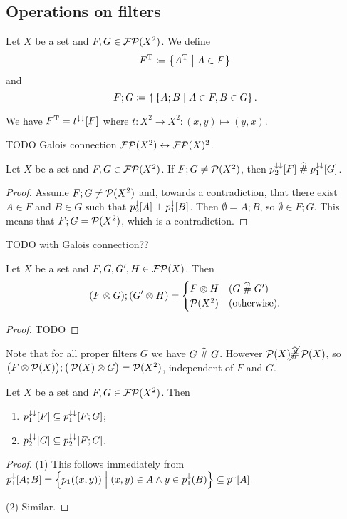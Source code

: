 \subsection{Operations on filters}
\begin{definition}
Let $X$ be a set and $F,G\in\operatorname{\mathcal{FP}}(X^2)$. We define
\[ F^{\mathrm{T}} \coloneqq \left\{ A^{\mathrm{T}} \;\middle|\; A\in F \right\}  \]
and
\[ F;G \coloneqq \operatorname{\uparrow} \left\{ A;B \;\middle|\; A\in F, B\in G \right\}. \]
\end{definition}

We have $F^{\mathrm{T}} = t^{\downarrow\downarrow}[F]$ where $t: X^2 \to X^2: (x,y)\mapsto (y,x)$.

TODO Galois connection $\operatorname{\mathcal{FP}}(X^2) \leftrightarrow \operatorname{\mathcal{FP}}(X)^2$.

\begin{lemma} \label{meshingFilterComposition}
Let $X$ be a set and $F,G\in\operatorname{\mathcal{FP}}(X^2)$. If $F;G \neq \operatorname{\mathcal{P}}(X^2)$, then $p_2^{\downarrow\downarrow}[F]\mathrel{\widehat{\#}} p_1^{\downarrow\downarrow}[G]$.
\end{lemma}
\begin{proof}
Assume $F;G \neq \operatorname{\mathcal{P}}(X^2)$ and, towards a contradiction, that there exist $A\in F$ and $B\in G$ such that $p_2^{\downarrow}[A]\perp p_1^{\downarrow}[B]$. Then $\emptyset = A;B$, so $\emptyset \in F;G$. This means that $F;G = \operatorname{\mathcal{P}}(X^2)$, which is a contradiction.
\end{proof}
TODO with Galois connection??

\begin{lemma} \label{compositionProductFilters}
Let $X$ be a set and $F,G, G', H\in\operatorname{\mathcal{FP}}(X)$. Then
\[ (F\otimes G);(G'\otimes H) = \begin{cases}
F\otimes H & (G\mathrel{\widehat{\#}} G') \\
\operatorname{\mathcal{P}}(X ^2) & (\text{otherwise}).
\end{cases}  \]
\end{lemma}
\begin{proof}
TODO
\end{proof}

Note that for all proper filters $G$ we have $G\mathrel{\widehat{\#}} G$. However $\operatorname{\mathcal{P}}(X)\cancel{\mathrel{\widehat{\#}}}\operatorname{\mathcal{P}}(X)$, so $\big(F\otimes \operatorname{\mathcal{P}}(X)\big);\big(\operatorname{\mathcal{P}}(X)\otimes G\big) = \operatorname{\mathcal{P}}(X^2)$, independent of $F$ and $G$.

\begin{lemma} \label{componentInclusionsFilterComposition}
Let $X$ be a set and $F,G\in\operatorname{\mathcal{FP}}(X^2)$. Then
\begin{enumerate}
\item $p_1^{\downarrow\downarrow}[F]\subseteq p_1^{\downarrow\downarrow}[F;G]$;
\item $p_2^{\downarrow\downarrow}[G]\subseteq p_2^{\downarrow\downarrow}[F;G]$.
\end{enumerate}
\end{lemma}
\begin{proof}
(1) This follows immediately from $p_1^{\downarrow}[A;B] = \left\{ p_1((x,y)) \;\middle|\; (x,y)\in A \land y\in p_1^{\downarrow}(B) \right\} \subseteq p_1^{\downarrow}[A]$.

(2) Similar.
\end{proof}

